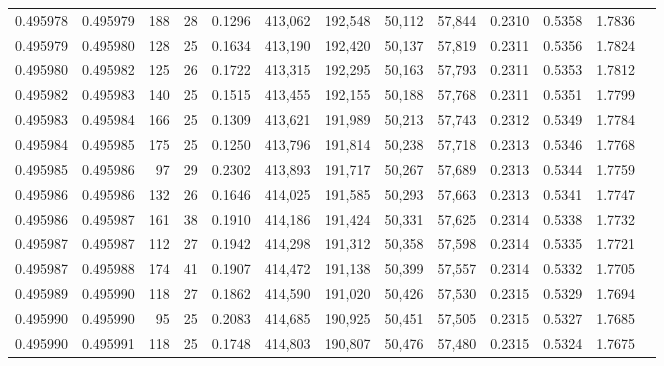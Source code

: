 \begin{tabular}{rrrrrrrrrrrrr}
0.495978 & 0.495979 & 188 &  28 &                                     0.1296 & 413,062 & 192,548 &  50,112 &  57,844 & 0.2310 & 0.5358 & 1.7836 \\
0.495979 & 0.495980 & 128 &  25 &                                     0.1634 & 413,190 & 192,420 &  50,137 &  57,819 & 0.2311 & 0.5356 & 1.7824 \\
0.495980 & 0.495982 & 125 &  26 &                                     0.1722 & 413,315 & 192,295 &  50,163 &  57,793 & 0.2311 & 0.5353 & 1.7812 \\
0.495982 & 0.495983 & 140 &  25 &                                     0.1515 & 413,455 & 192,155 &  50,188 &  57,768 & 0.2311 & 0.5351 & 1.7799 \\
0.495983 & 0.495984 & 166 &  25 &                                     0.1309 & 413,621 & 191,989 &  50,213 &  57,743 & 0.2312 & 0.5349 & 1.7784 \\
0.495984 & 0.495985 & 175 &  25 &                                     0.1250 & 413,796 & 191,814 &  50,238 &  57,718 & 0.2313 & 0.5346 & 1.7768 \\
0.495985 & 0.495986 &  97 &  29 &                                     0.2302 & 413,893 & 191,717 &  50,267 &  57,689 & 0.2313 & 0.5344 & 1.7759 \\
0.495986 & 0.495986 & 132 &  26 &                                     0.1646 & 414,025 & 191,585 &  50,293 &  57,663 & 0.2313 & 0.5341 & 1.7747 \\
0.495986 & 0.495987 & 161 &  38 &                                     0.1910 & 414,186 & 191,424 &  50,331 &  57,625 & 0.2314 & 0.5338 & 1.7732 \\
0.495987 & 0.495987 & 112 &  27 &                                     0.1942 & 414,298 & 191,312 &  50,358 &  57,598 & 0.2314 & 0.5335 & 1.7721 \\
0.495987 & 0.495988 & 174 &  41 &                                     0.1907 & 414,472 & 191,138 &  50,399 &  57,557 & 0.2314 & 0.5332 & 1.7705 \\
0.495989 & 0.495990 & 118 &  27 &                                     0.1862 & 414,590 & 191,020 &  50,426 &  57,530 & 0.2315 & 0.5329 & 1.7694 \\
0.495990 & 0.495990 &  95 &  25 &                                     0.2083 & 414,685 & 190,925 &  50,451 &  57,505 & 0.2315 & 0.5327 & 1.7685 \\
0.495990 & 0.495991 & 118 &  25 &                                     0.1748 & 414,803 & 190,807 &  50,476 &  57,480 & 0.2315 & 0.5324 & 1.7675 \\

\end{tabular}
